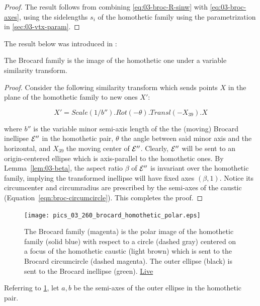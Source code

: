 \begin{proof}
The result follows from combining \cref{eq:03-broc-R-sinw} with \cref{eq:03-broc-axes}, using the sidelengths $s_i$ of the homothetic family using the parametrization in \cref{sec:03-vtx-param}.
\end{proof}

The result below was introduced in \cite[Thm 4.1]{reznik2020-similarityII}:

\begin{proposition}
The Brocard family is the image of the homothetic one under a variable similarity transform.
\end{proposition}

\begin{proof}
Consider the following similarity transform which sends points $X$ in the plane of the homothetic family to new ones $X'$:

\[X'=Scale(1/b'').Rot(-\theta).Transl(-X_{39}).X\]

\noindent where  $b''$ is the variable minor semi-axis length of the the (moving) Brocard inellipse $\mathcal{E}''$ in the homothetic pair, $\theta$ the angle between said minor axis and the horizontal, and $X_{39}$ the moving center of $\mathcal{E}''$. Clearly, $\mathcal{E}''$ will be sent to an origin-centered ellipse which is axis-parallel to the homothetic ones. By Lemma~\ref{lem:03-beta}, the aspect ratio $\beta$ of $\mathcal{E}''$ is invariant over the homothetic family, implying the transformed inellipse will have fixed axes $(\beta, 1)$. Notice its circumcenter and circumradius are prescribed by the semi-axes of the caustic (Equation~\ref{eqn:broc-circumcircle}). This completes the proof. 
\end{proof}

\begin{figure}
    \centering
    \texttt{[image: pics\_03\_260\_brocard\_homothetic\_polar.eps]}
    \caption{The Brocard family (magenta) is the polar image of the homothetic family (solid blue) with respect to a circle (dashed gray) centered on a focus of the homothetic caustic (light brown) which is sent to the Brocard circumcircle (dashed magenta). The outer ellipse (black) is sent to the Brocard inellipse (green). \href{https://bit.ly/2RwKmAM}{Live}}
    \label{fig:03-brocard-homoth}
\end{figure}

Referring to \cref{fig:03-brocard-homoth}, let $a,b$ be the semi-axes of the outer ellipse in the homothetic pair. 

